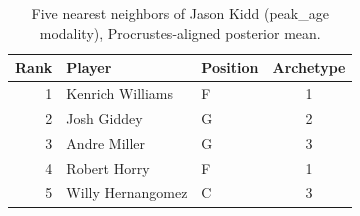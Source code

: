 \begin{table}[htbp]
  \centering\small
  \begin{tabular}{rllc}
    \toprule
    Rank & Player & Position & Archetype \\
    \midrule
    1 & Kenrich Williams & F & 1 \\
    2 & Josh Giddey & G & 2 \\
    3 & Andre Miller & G & 3 \\
    4 & Robert Horry & F & 1 \\
    5 & Willy Hernangomez & C & 3 \\
    \bottomrule
  \end{tabular}
  \caption{Five nearest neighbors of Jason Kidd (peak_age modality), Procrustes-aligned posterior mean.}
  \label{tab:Jason_Kidd_neighbors_peak_age}
\end{table}


